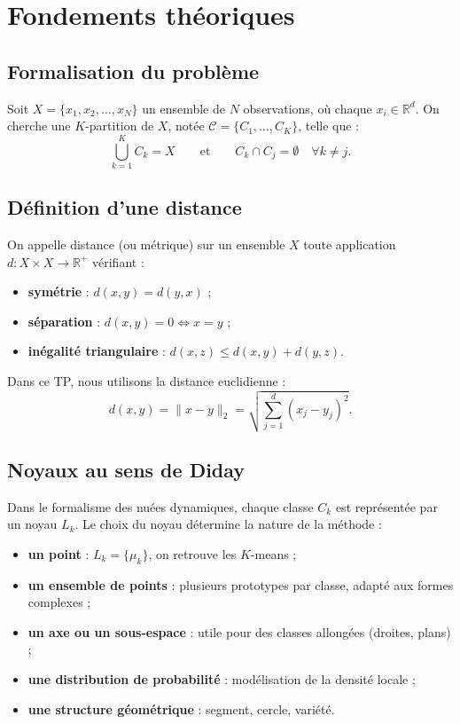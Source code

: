 \documentclass[a4paper, 11pt]{article}
\begin{document}
	\section{Fondements théoriques}
	
	\subsection{Formalisation du problème}
	
	Soit \(X = \{x_1, x_2, \dots, x_N\}\) un ensemble de \(N\)
	observations, où chaque \(x_i \in \mathbb{R}^d\). On cherche une
	\(K\)-partition de \(X\), notée \(\mathcal{C} = \{C_1, \dots, C_K\}\),
	telle que :
	\[
	\bigcup_{k=1}^{K} C_k = X \qquad \text{et} \qquad
	C_k \cap C_j = \emptyset \quad \forall k \neq j.
	\]
	
	\subsection{Définition d'une distance}
	
	On appelle distance (ou métrique) sur un ensemble \(X\) toute
	application \(d : X \times X \to \mathbb{R}^+\) vérifiant :
	\begin{itemize}
		\item \textbf{symétrie} : \(d(x, y) = d(y, x)\) ;
		\item \textbf{séparation} : \(d(x, y) = 0 \iff x = y\) ;
		\item \textbf{inégalité triangulaire} :
		\(d(x, z) \leq d(x, y) + d(y, z)\).
	\end{itemize}
	
	Dans ce TP, nous utilisons la distance euclidienne :
	\[
	d(x, y) = \|x - y\|_2
	= \sqrt{\sum_{j=1}^{d} (x_j - y_j)^2}.
	\]
	
	\subsection{Noyaux au sens de Diday}
	
	Dans le formalisme des nuées dynamiques, chaque classe \(C_k\) est
	représentée par un noyau \(L_k\). Le choix du noyau détermine la
	nature de la méthode :
	\begin{itemize}
		\item \textbf{un point} : \(L_k = \{\mu_k\}\), on retrouve les
		\(K\)-means ;
		\item \textbf{un ensemble de points} : plusieurs prototypes par
		classe, adapté aux formes complexes ;
		\item \textbf{un axe ou un sous-espace} : utile pour des classes
		allongées (droites, plans) ;
		\item \textbf{une distribution de probabilité} : modélisation de
		la densité locale ;
		\item \textbf{une structure géométrique} : segment, cercle,
		variété.
	\end{itemize}
	
\end{document}
